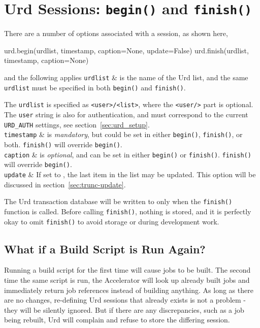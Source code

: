 \section{Urd Sessions:  \texttt{begin()} and \texttt{finish()}}

There are a number of options associated with a session, as shown
here,
\begin{python}
urd.begin(urdlist, timestamp, caption=None, update=False)
urd.finish(urdlist, timestamp, caption=None)
\end{python}
and the following applies
\starttabletwo
\RPtwo \texttt{urdlist} & is the name of the Urd list, and the same
  \texttt{urdlist} must be specified in both \texttt{begin()}
  and \texttt{finish()}.

  The \texttt{urdlist} is specified as \texttt{<user>/<list>}, where
  the \texttt{<user/>} part is optional.  The \texttt{user} string
  is also for authentication, and must correspond to the
  current \texttt{URD\_AUTH} settings, see section~\ref{sec:urd_setup}.\\[2ex]

\RPtwo \texttt{timestamp} & is \textsl{mandatory}, but could be set in either
  \texttt{begin()}, \texttt{finish()}, or both.  \texttt{finish()}
  will override \texttt{begin()}.\\[2ex]

\RPtwo \texttt{caption} & is \textsl{optional}, and can be set in either
  \texttt{begin()} or \texttt{finish()}.  \texttt{finish()}
  will override \texttt{begin()}.\\[2ex]

\RPtwo \texttt{update} &  If set to \pyTrue, the last item in the list may be updated.
  This option will be discussed in section~\ref{sec:trunc-update}.\\[2ex]
\stoptabletwo

The Urd transaction database will be written to only when
the \texttt{finish()} function is called.  Before
calling \texttt{finish()}, nothing is stored, and it is perfectly okay
to omit \texttt{finish()} to avoid storage or during development work.




\subsection{What if a Build Script is Run Again?}
Running a build script for the first time will cause jobs to be built.
The second time the same script is run, the Accelerator will look up
already built jobs and immediately return job references instead of building
anything.  As long as there are no changes, re-defining Urd sessions
that already exists is not a problem - they will be silently ignored.
But if there are any discrepancies, such as a job being rebuilt, Urd
will complain and refuse to store the differing session.

